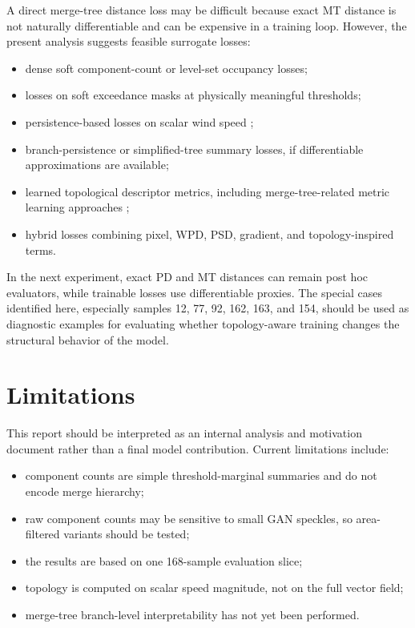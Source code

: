\documentclass[conference]{IEEEtran}
\begin{document}
A direct merge-tree distance loss may be difficult because exact MT distance is not naturally differentiable and can be expensive in a training loop. However, the present analysis suggests feasible surrogate losses:
\begin{itemize}
    \item dense soft component-count or level-set occupancy losses;
    \item losses on soft exceedance masks at physically meaningful thresholds;
    \item persistence-based losses on scalar wind speed \cite{KissiInterpolation_2025};
    \item branch-persistence or simplified-tree summary losses, if differentiable approximations are available;
    \item learned topological descriptor metrics, including merge-tree-related metric learning approaches \cite{QinDissertation_2025};
    \item hybrid losses combining pixel, WPD, PSD, gradient, and topology-inspired terms.
\end{itemize}

In the next experiment, exact PD and MT distances can remain post hoc evaluators, while trainable losses use differentiable proxies. The special cases identified here, especially samples 12, 77, 92, 162, 163, and 154, should be used as diagnostic examples for evaluating whether topology-aware training changes the structural behavior of the model.

\section{Limitations}

This report should be interpreted as an internal analysis and motivation document rather than a final model contribution. Current limitations include:
\begin{itemize}
    \item component counts are simple threshold-marginal summaries and do not encode merge hierarchy;
    \item raw component counts may be sensitive to small GAN speckles, so area-filtered variants should be tested;
    \item the results are based on one 168-sample evaluation slice;
    \item topology is computed on scalar speed magnitude, not on the full vector field;
    \item merge-tree branch-level interpretability has not yet been performed.
\end{itemize}
\end{document}
